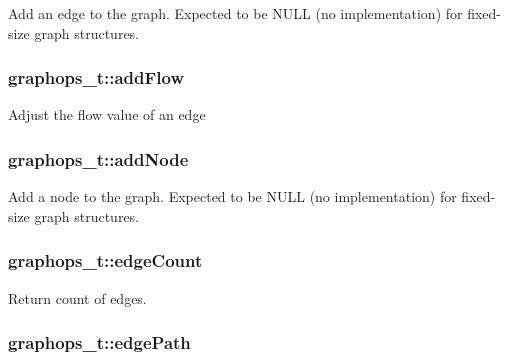Add an edge to the graph. Expected to be N\+U\+LL (no implementation) for fixed-\/size graph structures. 

\subsubsection[{\texorpdfstring{add\+Flow}{addFlow}}]{ graphops\+\_\+t\+::add\+Flow}\hypertarget{structgraphops__t_ae412853235d06cde6a63257a5fc172e1}{}\label{structgraphops__t_ae412853235d06cde6a63257a5fc172e1}
Adjust the flow value of an edge 
\subsubsection[{\texorpdfstring{add\+Node}{addNode}}]{ graphops\+\_\+t\+::add\+Node}\hypertarget{structgraphops__t_aa1fdab76a86ab2889415964b51f1738f}{}\label{structgraphops__t_aa1fdab76a86ab2889415964b51f1738f}


Add a node to the graph. Expected to be N\+U\+LL (no implementation) for fixed-\/size graph structures. 

\subsubsection[{\texorpdfstring{edge\+Count}{edgeCount}}]{ graphops\+\_\+t\+::edge\+Count}\hypertarget{structgraphops__t_a5db6e2eee59ada7705fb54bf5f6b9ee1}{}\label{structgraphops__t_a5db6e2eee59ada7705fb54bf5f6b9ee1}


Return count of edges. 

\subsubsection[{\texorpdfstring{edge\+Path}{edgePath}}]{ graphops\+\_\+t\+::edge\+Path}\hypertarget{structgraphops__t_ab0fdace070db2a1fa199e920b6136a04}{}\label{structgraphops__t_ab0fdace070db2a1fa199e920b6136a04}


